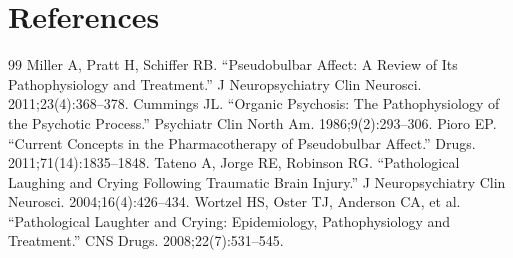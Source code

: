 \section*{References}
\begin{thebibliography}{99}
 Miller A, Pratt H, Schiffer RB. ``Pseudobulbar Affect: A Review of Its Pathophysiology and Treatment.'' J Neuropsychiatry Clin Neurosci. 2011;23(4):368--378.
 Cummings JL. ``Organic Psychosis: The Pathophysiology of the Psychotic Process.'' Psychiatr Clin North Am. 1986;9(2):293--306.
 Pioro EP. ``Current Concepts in the Pharmacotherapy of Pseudobulbar Affect.'' Drugs. 2011;71(14):1835--1848.
 Tateno A, Jorge RE, Robinson RG. ``Pathological Laughing and Crying Following Traumatic Brain Injury.'' J Neuropsychiatry Clin Neurosci. 2004;16(4):426--434.
 Wortzel HS, Oster TJ, Anderson CA, et al. ``Pathological Laughter and Crying: Epidemiology, Pathophysiology and Treatment.'' CNS Drugs. 2008;22(7):531--545.
\end{thebibliography}
